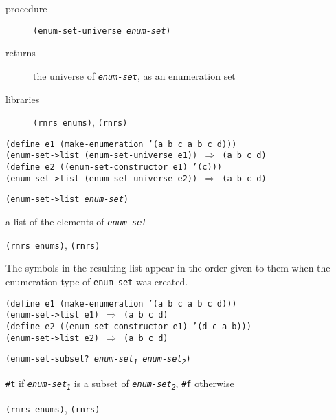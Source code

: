 \begin{description}

\label{objects_s293}\item[procedure] \texttt{(enum-set-universe \textit{enum-set})}



\item[returns] the universe of \texttt{\textit{enum-set}}, as an enumeration set


\item[libraries] \texttt{(rnrs enums)}, \texttt{(rnrs)}
\end{description}


\begin{alltt}
(define e1 (make-enumeration '(a b c a b c d)))
(enum-set-\textgreater{}list (enum-set-universe e1)) \(\Rightarrow\) (a b c d)
(define e2 ((enum-set-constructor e1) '(c)))
(enum-set-\textgreater{}list (enum-set-universe e2)) \(\Rightarrow\) (a b c d)
\end{alltt}

\begin{description}

\label{objects_s294}\item[procedure] \texttt{(enum-set-\textgreater{}list \textit{enum-set})}



\item[returns] a list of the elements of \texttt{\textit{enum-set}}


\item[libraries] \texttt{(rnrs enums)}, \texttt{(rnrs)}
\end{description}


The symbols in the resulting list appear in the order given to
them when the enumeration type of \texttt{enum-set} was created.


\begin{alltt}
(define e1 (make-enumeration '(a b c a b c d)))
(enum-set-\textgreater{}list e1) \(\Rightarrow\) (a b c d)
(define e2 ((enum-set-constructor e1) '(d c a b)))
(enum-set-\textgreater{}list e2) \(\Rightarrow\) (a b c d)
\end{alltt}

\begin{description}

\label{objects_s295}\item[procedure] \texttt{(enum-set-subset? \textit{enum-set\textsubscript{1}} \textit{enum-set\textsubscript{2}})}



\item[returns] \texttt{\#{}t} if \texttt{\textit{enum-set\textsubscript{1}}} is a subset of \texttt{\textit{enum-set\textsubscript{2}}}, \texttt{\#{}f} otherwise


\item[libraries] \texttt{(rnrs enums)}, \texttt{(rnrs)}
\end{description}


